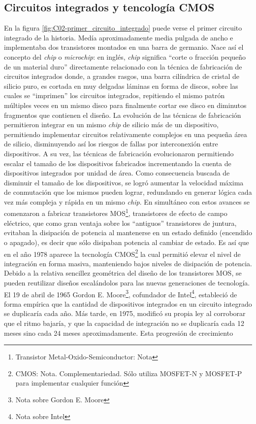 \subsection{Circuitos integrados y tencología CMOS}

En la figura \ref{fig:C02-primer_circuito_integrado} puede verse el primer circuito integrado de la historia. Medía aproximadamente media pulgada de ancho e implementaba dos transistores montados en una barra de germanio. Nace así el concepto del \emph{chip} o \emph{microchip}: en inglés, \emph{chip} significa ``corte o fracción pequeño de un material duro'' directamente relacionado con la técnica de fabricación de circuitos integrados donde, a grandes rasgos, una barra cilíndrica de cristal de silicio puro, es cortada en muy delgadas láminas en forma de discos, sobre las cuales se ``imprimen'' los circuitos integrados, repitiendo el mismo patrón múltiples veces en un mismo disco para finalmente cortar ese disco en diminutos fragmentos que contienen el diseño. La evolución de las técnicas de fabricación permitieron integrar en un mismo \emph{chip} de silicio más de un dispositivo, permitiendo implementar circuitos relativamente complejos en una pequeña área de silicio, disminuyendo así los riesgos de fallas por interconexión entre dispositivos. A su vez, las técnicas de fabricación evolucionaron permitiendo escalar el tamaño de los dispositivos fabricados incrementando la cuenta de dispositivos integrados por unidad de área. Como consecuencia buscada de disminuir el tamaño de los dispositivos, se logró aumentar la velocidad máxima de conmutación que los mismos pueden lograr, redundando en generar lógica cada vez más compleja y rápida en un mismo \emph{chip}. En simultáneo con estos avances se comenzaron a fabricar transistores MOS\footnote{Transistor Metal-Oxido-Semiconductor: Nota}, transistores de efecto de campo eléctrico, que como gran ventaja sobre los ``antiguos'' transistores de juntura, evitaban la disipación de potencia al mantenerse en un estado definido (encendido o apagado), es decir que sólo disipaban potencia al cambiar de estado. Es así que en el año 1978 aparece la tecnología CMOS\footnote{CMOS: Nota. Complementariedad. Sólo utiliza MOSFET-N y MOSFET-P para implementar cualquier función} la cual permitió elevar el nivel de integración en forma masiva, manteniendo bajos niveles de disipación de potencia. Debido a la relativa sencillez geométrica del diseño de los transistores MOS, se pueden reutilizar diseños escalándolos para las nuevas generaciones de tecnología. El 19 de abril de 1965 Gordon E. Moore\footnote{Nota sobre Gordon E. Moore}, cofundador de Intel\footnote{Nota sobre Intel}, estableció de forma empírica que la cantidad de dispositivos integrados en un circuito integrado se duplicaría cada año. Más tarde, en 1975, modificó su propia ley al corroborar que el ritmo bajaría, y que la capacidad de integración no se duplicaría cada 12 meses sino cada 24 meses aproximadamente. Esta progresión de crecimiento 